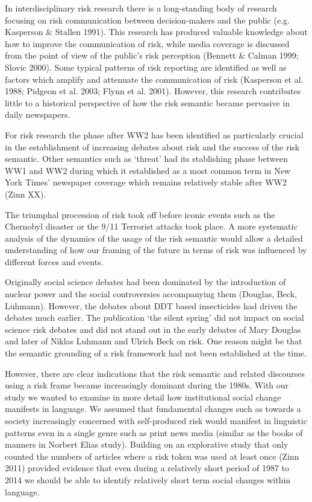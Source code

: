 In interdisciplinary risk research there is a long-standing body of research focusing on risk communication between decision-makers and the public (e.g. Kasperson \& Stallen 1991). This research has produced valuable knowledge about how to improve the communication of risk, while media coverage is discussed from the point of view of the public's risk perception (Bennett \& Calman 1999; Slovic 2000). Some typical patterns of risk reporting are identified as well as factors which amplify and attenuate the communication of risk (Kasperson et al. 1988; Pidgeon et al. 2003; Flynn et al. 2001). However, this research contributes little to a historical perspective of how the risk semantic became pervasive in daily newspapers. 

For risk research the phase after WW2 has been identified as particularly crucial in the establishment of increasing debates about risk and the success of the risk semantic. Other semantics such as `threat' had its stablishing phase between WW1 and WW2 during which it established as a most common term in New York Times' newspaper coverage which remains relatively stable after WW2 (Zinn XX).

The triumphal procession of risk took off before iconic events such as the Chernobyl disaster or the 9\slash 11 Terrorist attacks took place. A more systematic analysis of the dynamics of the usage of the risk semantic would allow a detailed understanding of how our framing of the future in terms of risk was influenced by different forces and events. 

Originally social science debates had been dominated by the introduction of nuclear power and the social controversies accompanying them (Douglas, Beck, Luhmann). However, the debates about DDT based insecticides had driven the debates much earlier. The publication `the silent spring' did not impact on social science risk debates and did not stand out in the early debates of Mary Douglas and later of Niklas Luhmann and Ulrich Beck on risk. One reason might be that the semantic grounding of a risk framework had not been established at the time. 

However, there are clear indications that the risk semantic and related discourses using a risk frame became increasingly dominant during the 1980s. With our study we wanted to examine in more detail how institutional social change manifests in language. We assumed that fundamental changes such as towards a society increasingly concerned with self-produced risk would manifest in linguistic patterns even in a single genre such as print news media (similar as the books of manners in Norbert Elias study). Building on an explorative study that only counted the numbers of articles where a risk token was used at least once (Zinn 2011) provided evidence that even during a relatively short period of 1987 to 2014 we should be able to identify relatively short term social changes within language. 

